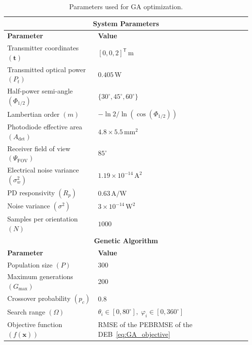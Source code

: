 \documentclass[journal]{IEEEtran}
\newcommand{\added}[1]{{\color{blue}#1}}
\newcommand{\deleted}[1]{{\color{red}#1}}
\begin{document}
\begin{table}[tbh]
\centering
\caption{Parameters used for GA optimization.}
\label{tab:ga_params}
\begin{tabular}{|l|l|}
\hline
\multicolumn{2}{|c|}{\textbf{System Parameters}} \\ \hline
\textbf{Parameter}                  & \textbf{Value}                         \\ \hline
Transmitter coordinates $(\mathbf{t})$ & \([0,0,2]^{\mathsf T}\,\mathrm{m}\)              \\ \hline
Transmitted optical power $(P_t)$   & \(0.405\,\mathrm{W}\)            \\ \hline
Half-power semi-angle $(\Phi_{1/2})$ & \(\{30^\circ,45^\circ,60^\circ\}\)                \\ \hline
Lambertian order $(m)$              & \(-\ln2/\ln(\cos(\Phi_{1/2}))\)    \\ \hline
Photodiode effective area $(A_{\mathrm{det}})$        & \(4.8\times5.5\,\mathrm{mm}^2\) \\ \hline
Receiver field of view $(\Psi_{\mathrm{FOV}})$        & \(85^\circ\)       \\ \hline
Electrical noise variance $(\sigma_w^2)$ & \(1.19\times10^{-14}\,\mathrm{A}^2\) \\ \hline
PD responsivity $(R_{p})$ & \(0.63\,\mathrm{A/W}\)          \\ \hline
Noise variance $(\sigma^2)$         & \(3\times10^{-14}\,\mathrm{W}^2\) \\ \hline
Samples per orientation $(N)$       & \(1000\)                           \\ \hline
\multicolumn{2}{|c|}{\textbf{Genetic Algorithm}} \\ \hline
\textbf{Parameter}                  & \textbf{Value}                         \\ \hline
Population size $(P)$                    & 300                                    \\ \hline
Maximum generations $(G_{\mathrm{max}})$     & 200                                    \\ \hline
Crossover probability $(p_c)$       & 0.8                                    \\ \hline
Search range $(\Omega)$             & \(\theta_{i}\in[0,80^\circ],\;\varphi_{i}\in[0,360^\circ]\) \\ \hline
Objective function $(f(\mathbf x))$   & \deleted{RMSE of the PEB}\added{RMSE of the DEB~\eqref{eq:GA_objective}}                        \\ \hline

\end{tabular}
\end{table}
\end{document}
